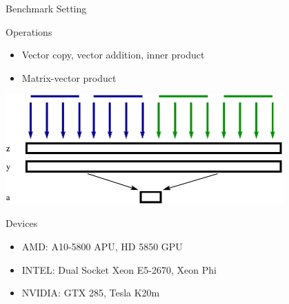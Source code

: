 \begin{frame}{Benchmark Setting}

  \begin{block}{Operations}
   \begin{itemize}
    \item Vector copy, vector addition, inner product
    \item Matrix-vector product
   \end{itemize}
  \end{block}

  \begin{center} \includegraphics[width=0.8\textwidth]{figures/inner-product-kernel} \end{center}

  \begin{block}{Devices}
   \begin{itemize}
    \item AMD: A10-5800 APU, HD 5850 GPU
    \item INTEL: Dual Socket Xeon E5-2670, Xeon Phi
    \item NVIDIA: GTX 285, Tesla K20m
   \end{itemize}
  \end{block}
  
\end{frame}
